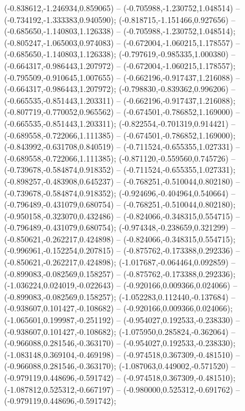  (-0.838612,-1.246934,0.859065) -- (-0.705988,-1.230752,1.048514) -- (-0.734192,-1.333383,0.940590);
 (-0.818715,-1.151466,0.927656) -- (-0.685650,-1.140803,1.126338) -- (-0.705988,-1.230752,1.048514);
 (-0.805247,-1.065003,0.974083) -- (-0.672004,-1.060215,1.178557) -- (-0.685650,-1.140803,1.126338);
 (-0.797619,-0.985335,1.000380) -- (-0.664317,-0.986443,1.207972) -- (-0.672004,-1.060215,1.178557);
 (-0.795509,-0.910645,1.007655) -- (-0.662196,-0.917437,1.216088) -- (-0.664317,-0.986443,1.207972);
 (-0.798830,-0.839362,0.996206) -- (-0.665535,-0.851443,1.203311) -- (-0.662196,-0.917437,1.216088);
 (-0.807719,-0.770052,0.965562) -- (-0.674501,-0.786852,1.169000) -- (-0.665535,-0.851443,1.203311);
 (-0.822554,-0.701319,0.914421) -- (-0.689558,-0.722066,1.111385) -- (-0.674501,-0.786852,1.169000);
 (-0.843992,-0.631708,0.840519) -- (-0.711524,-0.655355,1.027331) -- (-0.689558,-0.722066,1.111385);
 (-0.871120,-0.559560,0.745726) -- (-0.739678,-0.584874,0.918352) -- (-0.711524,-0.655355,1.027331);
 (-0.898257,-0.483908,0.645237) -- (-0.768251,-0.510044,0.802180) -- (-0.739678,-0.584874,0.918352);
 (-0.924696,-0.404964,0.540664) -- (-0.796489,-0.431079,0.680754) -- (-0.768251,-0.510044,0.802180);
 (-0.950158,-0.323070,0.432486) -- (-0.824066,-0.348315,0.554715) -- (-0.796489,-0.431079,0.680754);
 (-0.974348,-0.238659,0.321299) -- (-0.850621,-0.262217,0.424898) -- (-0.824066,-0.348315,0.554715);
 (-0.996961,-0.152254,0.207815) -- (-0.875762,-0.173388,0.292336) -- (-0.850621,-0.262217,0.424898);
 (-1.017687,-0.064464,0.092859) -- (-0.899083,-0.082569,0.158257) -- (-0.875762,-0.173388,0.292336);
 (-1.036224,0.024019,-0.022643) -- (-0.920166,0.009366,0.024066) -- (-0.899083,-0.082569,0.158257);
 (-1.052283,0.112440,-0.137684) -- (-0.938607,0.101427,-0.108682) -- (-0.920166,0.009366,0.024066);
 (-1.065601,0.199987,-0.251192) -- (-0.954027,0.192533,-0.238330) -- (-0.938607,0.101427,-0.108682);
 (-1.075950,0.285824,-0.362064) -- (-0.966088,0.281546,-0.363170) -- (-0.954027,0.192533,-0.238330);
 (-1.083148,0.369104,-0.469198) -- (-0.974518,0.367309,-0.481510) -- (-0.966088,0.281546,-0.363170);
 (-1.087063,0.449002,-0.571520) -- (-0.979119,0.448696,-0.591742) -- (-0.974518,0.367309,-0.481510);
 (-1.087812,0.525312,-0.667197) -- (-0.980000,0.525312,-0.691762) -- (-0.979119,0.448696,-0.591742);
